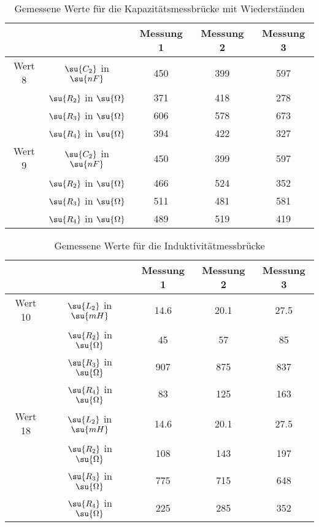 \begin{table}
  \centering
  \label{tab:Kapazitätohne}
  \caption{Gemessene Werte für die Kapazitätsmessbrücke mit Wiederständen}
  \begin{tabular}{ c c c c c}
    \toprule
    & & Messung 1 & Messung 2 & Messung 3 \\
    \midrule
    Wert 8 & \multicolumn{1}{c|}{$\su{C_2}$  in  $\su{nF}     $ } & 450 & 399 & 597 \\
           & \multicolumn{1}{c|}{$\su{R_2}$  in  $\su{\Omega} $ } & 371 & 418 & 278 \\
           & \multicolumn{1}{c|}{$\su{R_3}$  in  $\su{\Omega} $ } & 606 & 578 & 673 \\
           & \multicolumn{1}{c|}{$\su{R_4}$  in  $\su{\Omega} $ } & 394 & 422 & 327 \\
    \midrule
    Wert 9 & \multicolumn{1}{c|}{$\su{C_2}$  in  $\su{nF}     $ } & 450 & 399 & 597 \\
           & \multicolumn{1}{c|}{$\su{R_2}$  in  $\su{\Omega} $ } & 466 & 524 & 352 \\
           & \multicolumn{1}{c|}{$\su{R_3}$  in  $\su{\Omega} $ } & 511 & 481 & 581 \\
           & \multicolumn{1}{c|}{$\su{R_4}$  in  $\su{\Omega} $ } & 489 & 519 & 419 \\
    \bottomrule
  \end{tabular}
\end{table}


\begin{table}
  \centering
  \label{tab:Induktivitätsmessbrücke}
  \caption{Gemessene Werte für die Induktivitätmessbrücke}
  \begin{tabular}{ c c c c c}
    \toprule
    & & Messung 1 & Messung 2 & Messung 3 \\
    \midrule
    Wert 10 & \multicolumn{1}{c|}{$\su{L_2}$  in  $\su{mH}     $ } & 14.6 & 20.1 & 27.5 \\
            & \multicolumn{1}{c|}{$\su{R_2}$  in  $\su{\Omega} $ } & 45  & 57  & 85  \\
            & \multicolumn{1}{c|}{$\su{R_3}$  in  $\su{\Omega} $ } & 907 & 875 & 837 \\
            & \multicolumn{1}{c|}{$\su{R_4}$  in  $\su{\Omega} $ } & 83  & 125 & 163 \\
    \midrule
    Wert 18 & \multicolumn{1}{c|}{$\su{L_2}$  in  $\su{mH}     $ } & 14.6 & 20.1 & 27.5 \\
            & \multicolumn{1}{c|}{$\su{R_2}$  in  $\su{\Omega} $ } & 108 & 143 & 197 \\
            & \multicolumn{1}{c|}{$\su{R_3}$  in  $\su{\Omega} $ } & 775 & 715 & 648 \\
            & \multicolumn{1}{c|}{$\su{R_4}$  in  $\su{\Omega} $ } & 225 & 285 & 352 \\
    \bottomrule
  \end{tabular}
\end{table}


